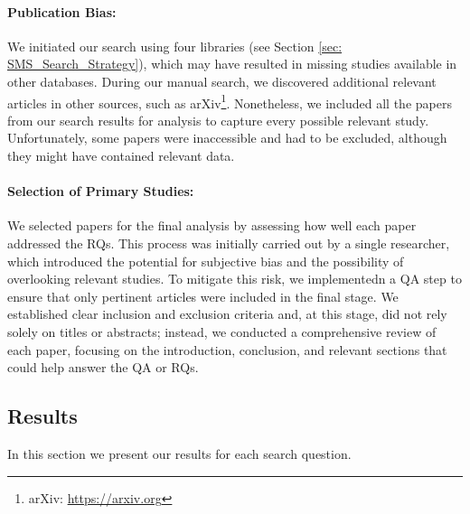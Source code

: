 \paragraph{\textbf{Publication Bias:}}
We initiated our search using four libraries (see Section \ref{sec: SMS_Search_Strategy}), which may have resulted in missing studies available in other databases. 
During our manual search, we discovered additional relevant articles in other sources, such as arXiv\footnote{arXiv: \url{https://arxiv.org}}. Nonetheless, we included all the papers from our 
search results for analysis to capture every possible relevant study. Unfortunately, some papers were inaccessible and had to be excluded, although they might have contained relevant data.


\paragraph{\textbf{Selection of Primary Studies:}}
We selected papers for the final analysis by assessing how well each paper addressed the RQs. This process was initially carried out by a single researcher, which introduced the potential 
for subjective bias and the possibility of overlooking relevant studies. To mitigate this risk, we implementedn a QA step to ensure that only pertinent articles were included in the final stage.
We established clear inclusion and exclusion criteria and, at this stage, did not rely solely on titles or abstracts; instead, we conducted a comprehensive review of each paper, focusing on the 
introduction, conclusion, and relevant sections that could help answer the QA or RQs.

\subsection{Results}
In this section we present our results for each search question.

